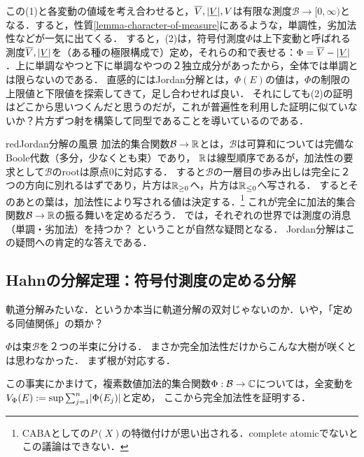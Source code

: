 \documentclass[uplatex, dvipdfmx]{jsreport}
\renewcommand{\B}{\mathcal{B}}
\begin{document}
\begin{remarks}[普遍性を用いた証明？]
    この(1)と各変動の値域を考え合わせると，$\overline{V},\lvert\underline{V}\rvert,V$は有限な測度$\B\to[0,\infty)$となる．すると，性質\ref{lemma-character-of-measure}にあるような，単調性，劣加法性などが一気に出てくる．
    すると，(2)は，符号付測度$\Phi$は上下変動と呼ばれる測度$\overline{V},\lvert\underline{V}\rvert$を（ある種の極限構成で）定め，それらの和で表せる：$\Phi=\overline{V}-\lvert\underline{V}\rvert$．上に単調なやつと下に単調なやつの２独立成分があったから，全体では単調とは限らないのである．
    直感的にはJordan分解とは，$\Phi(E)$の値は，$\Phi$の制限の上限値と下限値を探索してきて，足し合わせれば良い．
    それにしても(2)の証明はどこから思いつくんだと思うのだが，これが普遍性を利用した証明に似ていないか？片方ずつ射を構築して同型であることを導いているのである．
\end{remarks}

\begin{tbox}{red}{Jordan分解の風景}
    加法的集合関数$\B\to\R$とは，$\B$は可算和については完備なBoole代数（多分，少なくとも束）であり，
    $\mathbb{R}$は線型順序であるが，加法性の要求として$\B$のrootは原点$0$に対応する．
    すると$\B$の一層目の歩み出しは完全に２つの方向に別れるはずであり，片方は$\mathbb{R}_{\ge 0}$へ，片方は$\mathbb{R}_{\le 0}$へ写される．
    するとそのあとの葉は，加法性により写される値は決定する．\footnote{CABAとしての$P(X)$の特徴付けが思い出される．complete atomicでないとこの議論はできない．}
    これが完全に加法的集合関数$\B\to\R$の振る舞いを定めるだろう．
    では，それぞれの世界では測度の消息（単調・劣加法）を持つか？
    ということが自然な疑問となる．
    Jordan分解はこの疑問への肯定的な答えである．
\end{tbox}

\subsection{Hahnの分解定理：符号付測度の定める分解}

\begin{tcolorbox}[colframe=ForestGreen, colback=ForestGreen!10!white,breakable,colbacktitle=ForestGreen!40!white,coltitle=black,fonttitle=\bfseries\sffamily,
title=]
    軌道分解みたいな．というか本当に軌道分解の双対じゃないのか．いや，「定める同値関係」の類か？
    
    $\Phi$は束$\B$を２つの半束に分ける．
    まさか完全加法性だけからこんな大樹が咲くとは思わなかった．
    まず根が対応する．

    この事実にかまけて，複素数値加法的集合関数$\Phi:\B\to\C$については，全変動を$V_\Phi(E):=\sup\sum^n_{j=1}\lvert\Phi(E_j)\rvert$と定め，
    ここから完全加法性を証明する．
\end{tcolorbox}
\end{document}
